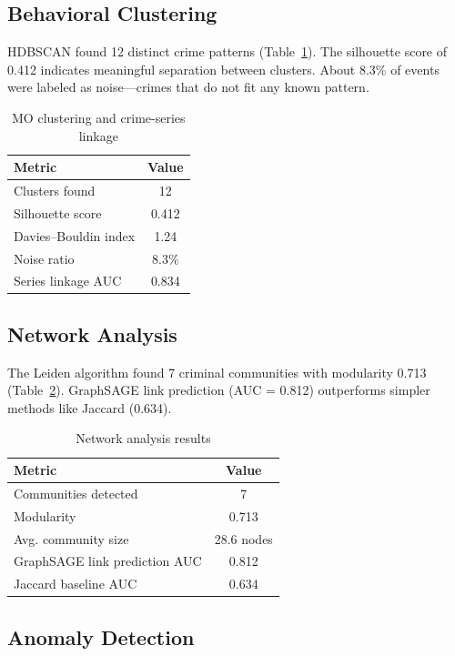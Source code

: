 \documentclass[a4paper,10pt,twocolumn]{article}
\begin{document}
\subsection{Behavioral Clustering}

HDBSCAN found 12 distinct crime patterns (Table~\ref{tab:cluster}). The silhouette score of 0.412 indicates meaningful separation between clusters. About 8.3\% of events were labeled as noise---crimes that do not fit any known pattern.

\begin{table}[H]
\centering
\caption{MO clustering and crime-series linkage}
\label{tab:cluster}
\begin{tabular}{@{}lc@{}}
\toprule
\textbf{Metric} & \textbf{Value} \\
\midrule
Clusters found & 12 \\
Silhouette score & 0.412 \\
Davies--Bouldin index & 1.24 \\
Noise ratio & 8.3\% \\
Series linkage AUC & 0.834 \\
\bottomrule
\end{tabular}
\end{table}

\subsection{Network Analysis}

The Leiden algorithm found 7 criminal communities with modularity 0.713 (Table~\ref{tab:network}). GraphSAGE link prediction (AUC = 0.812) outperforms simpler methods like Jaccard (0.634).

\begin{table}[H]
\centering
\caption{Network analysis results}
\label{tab:network}
\begin{tabular}{@{}lc@{}}
\toprule
\textbf{Metric} & \textbf{Value} \\
\midrule
Communities detected & 7 \\
Modularity & 0.713 \\
Avg. community size & 28.6 nodes \\
GraphSAGE link prediction AUC & 0.812 \\
Jaccard baseline AUC & 0.634 \\
\bottomrule
\end{tabular}
\end{table}

\subsection{Anomaly Detection}
\end{document}
